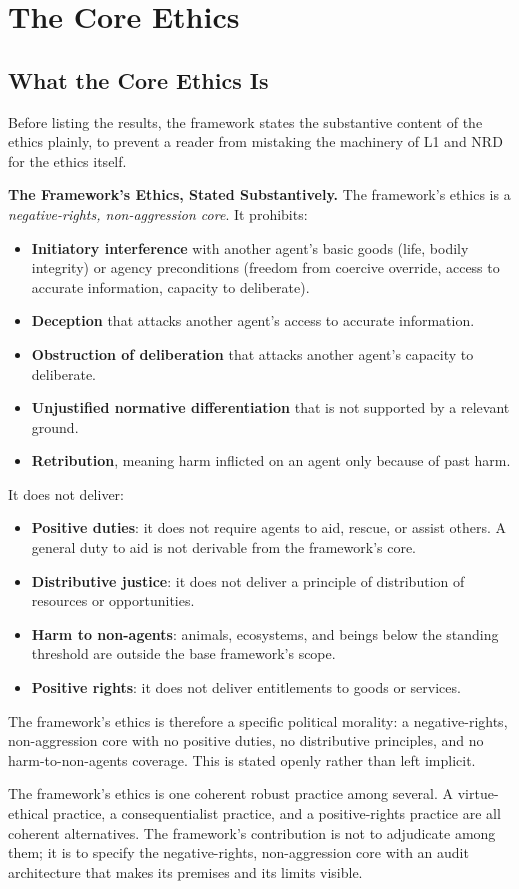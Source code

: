 \documentclass[11pt]{article}
\begin{document}
\section{The Core Ethics}\label{sec:core}
\subsection{What the Core Ethics Is}
Before listing the results, the framework states the substantive content of the ethics plainly, to prevent a reader from mistaking the machinery of L1 and NRD for the ethics itself.
\begin{paperbox}
\textbf{The Framework's Ethics, Stated Substantively.} The framework's ethics is a \emph{negative-rights, non-aggression core}. It prohibits:
\begin{itemize}
\item \textbf{Initiatory interference} with another agent's basic goods (life, bodily integrity) or agency preconditions (freedom from coercive override, access to accurate information, capacity to deliberate).
\item \textbf{Deception} that attacks another agent's access to accurate information.
\item \textbf{Obstruction of deliberation} that attacks another agent's capacity to deliberate.
\item \textbf{Unjustified normative differentiation} that is not supported by a relevant ground.
\item \textbf{Retribution}, meaning harm inflicted on an agent only because of past harm.
\end{itemize}
It does not deliver:
\begin{itemize}
\item \textbf{Positive duties}: it does not require agents to aid, rescue, or assist others. A general duty to aid is not derivable from the framework's core.
\item \textbf{Distributive justice}: it does not deliver a principle of distribution of resources or opportunities.
\item \textbf{Harm to non-agents}: animals, ecosystems, and beings below the standing threshold are outside the base framework's scope.
\item \textbf{Positive rights}: it does not deliver entitlements to goods or services.
\end{itemize}
The framework's ethics is therefore a specific political morality: a negative-rights, non-aggression core with no positive duties, no distributive principles, and no harm-to-non-agents coverage. This is stated openly rather than left implicit.
\end{paperbox}
The framework's ethics is one coherent robust practice among several. A virtue-ethical practice, a consequentialist practice, and a positive-rights practice are all coherent alternatives. The framework's contribution is not to adjudicate among them; it is to specify the negative-rights, non-aggression core with an audit architecture that makes its premises and its limits visible.
\end{document}
